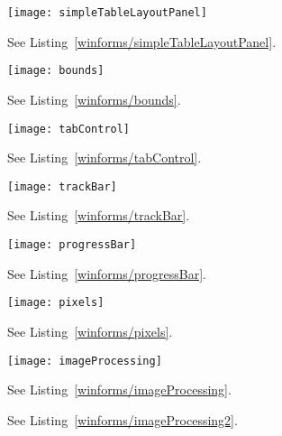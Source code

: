 %
%
\begin{figure}
  \centering
  \texttt{[image: simpleTableLayoutPanel]}
  \caption{See Listing~\ref{winforms/simpleTableLayoutPanel}.}
  \label{fig: simpleTableLayoutPanel}
\end{figure}

%
%
\begin{figure}
  \centering
  \texttt{[image: bounds]}
  \caption{See Listing~\ref{winforms/bounds}.}
  \label{fig:bounds}
\end{figure}

%
%
\begin{figure}
  \centering
  \texttt{[image: tabControl]}
  \caption{See Listing~\ref{winforms/tabControl}.}
  \label{fig: tabControl}
\end{figure}

%
%
\begin{figure}
  \centering
  \texttt{[image: trackBar]}
  \caption{See Listing~\ref{winforms/trackBar}.}
  \label{fig: trackBar}
\end{figure}

%
%
\begin{figure}
  \centering
  \texttt{[image: progressBar]}
  \caption{See Listing~\ref{winforms/progressBar}.}
  \label{fig:bounds}
\end{figure}

%
%
\begin{figure}
  \centering
  \texttt{[image: pixels]}
  \caption{See Listing~\ref{winforms/pixels}.}
  \label{fig:pixels}
\end{figure}

%
%
\begin{figure}
  \centering
  \texttt{[image: imageProcessing]}
  \caption{See Listing~\ref{winforms/imageProcessing}.}
  \label{fig:imageProcessing}
\end{figure}
%
%
\begin{figure}
  \centering
  \caption{See Listing~\ref{winforms/imageProcessing2}.}
  \label{fig:imageProcessing2}
\end{figure}


